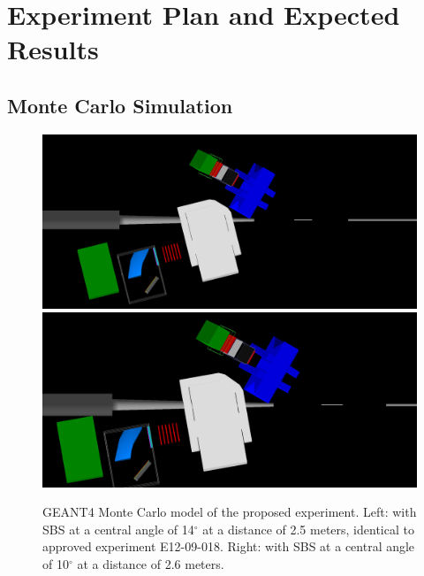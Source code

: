 \section{Experiment Plan and Expected Results}
\subsection{Monte Carlo Simulation}
\begin{figure}[h]
  \begin{center}
    \includegraphics[width=.48\textwidth]{figures/SIDISlayout14deg.png}
    \includegraphics[width=.48\textwidth]{figures/SIDISlayout10deg.png}
  \end{center}
  \caption{\label{fig:layout} GEANT4 Monte Carlo model of the proposed experiment. Left: with SBS at a central angle of 14$^\circ$ at a distance of 2.5 meters, identical to approved experiment E12-09-018. Right: with SBS at a central angle of 10$^\circ$ at a distance of 2.6 meters.}
\end{figure}

